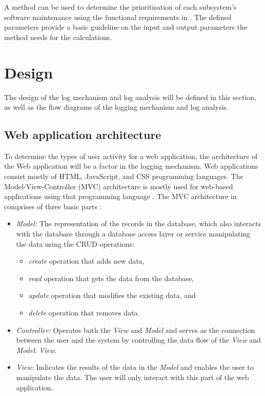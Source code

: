 A method can be used to determine the prioritisation of each subsystem's software maintenance using the functional requirements in . The defined parameters provide a basic guideline on the input and output parameters the method needs for the calculations.

\clearpage

\section{Design}\label{sec:ch2_design}
The design of the log mechanism and log analysis will be defined in this section, as well as the flow diagrams of the logging mechanism and log analysis.

\subsection{Web application architecture}\label{sec:ch2_webApplicationArchitecture}
To determine the types of user activity for a web application, the architecture of the Web application will be a factor in the logging mechanism. Web applications consist mostly of HTML, JavaScript, and CSS programming languages. The Model-View-Controller (MVC) architecture is mostly used for web-based applications using that programming language \cite{Jailia2016}. The MVC architecture in  comprises of three basic parts \cite{Jailia2016}:

\begin{itemize}
	\item \textit{Model:} The representation of the records in the database, which also interacts with the database through a database access layer or service manipulating the data using the CRUD operations:
	\begin{itemize}
		\item \textit{create} operation that adds new data,
		\item \textit{read} operation that gets the data from the database,
		\item \textit{update} operation that modifies the existing data, and
		\item \textit{delete} operation that removes data.
	\end{itemize}
	\item \textit{Controller:} Operates both the \textit{View} and \textit{Model} and serves as the connection between the user and the system by controlling the data flow of the \textit{View}  and \textit{Model}.
	\textit{View}.
	\item \textit{View:} Indicates the results of the data in the \textit{Model} and enables the user to manipulate the data. The user will only interact with this part of the web application.
\end{itemize}

